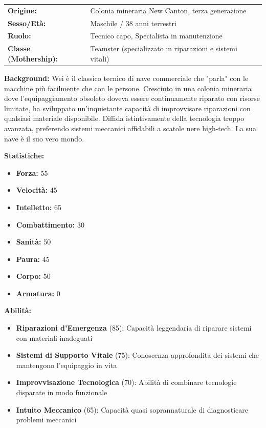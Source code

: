 \documentclass[11pt,a4paper]{article}
\begin{document}
\begin{tcolorbox}[colback=mininglightorange!20, colframe=miningorange]
\begin{tabularx}{\textwidth}{lX}
\textbf{Origine:} & Colonia mineraria New Canton, terza generazione \\
\textbf{Sesso/Età:} & Maschile / 38 anni terrestri \\
\textbf{Ruolo:} & Tecnico capo, Specialista in manutenzione \\
\textbf{Classe (Mothership):} & Teamster (specializzato in riparazioni e sistemi vitali) \\
\end{tabularx}

\textbf{Background:} Wei è il classico tecnico di nave commerciale che "parla" con le macchine più facilmente che con le persone. Cresciuto in una colonia mineraria dove l'equipaggiamento obsoleto doveva essere continuamente riparato con risorse limitate, ha sviluppato un'inquietante capacità di improvvisare riparazioni con qualsiasi materiale disponibile. Diffida istintivamente della tecnologia troppo avanzata, preferendo sistemi meccanici affidabili a scatole nere high-tech. La sua nave è il suo vero mondo.

\textbf{Statistiche:}
\begin{itemize}[leftmargin=*]
\item \textbf{Forza:} 55
\item \textbf{Velocità:} 45
\item \textbf{Intelletto:} 65
\item \textbf{Combattimento:} 30
\item \textbf{Sanità:} 50
\item \textbf{Paura:} 45
\item \textbf{Corpo:} 50
\item \textbf{Armatura:} 0
\end{itemize}

\textbf{Abilità:}
\begin{itemize}[leftmargin=*]
\item \textbf{Riparazioni d'Emergenza} (85): Capacità leggendaria di riparare sistemi con materiali inadeguati
\item \textbf{Sistemi di Supporto Vitale} (75): Conoscenza approfondita dei sistemi che mantengono l'equipaggio in vita
\item \textbf{Improvvisazione Tecnologica} (70): Abilità di combinare tecnologie disparate in modo funzionale
\item \textbf{Intuito Meccanico} (65): Capacità quasi soprannaturale di diagnosticare problemi meccanici
\end{itemize}


\end{tcolorbox}
\end{document}
